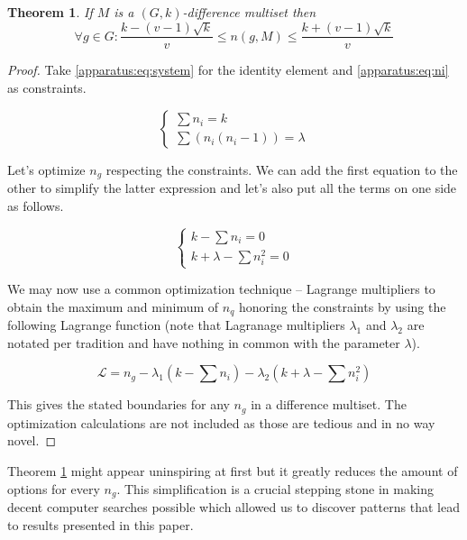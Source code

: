 \documentclass{article}
\theoremstyle{plain}
\newtheorem{theorem}{Theorem}[section]
\theoremstyle{definition}
\theoremstyle{remark}
\begin{document}
		\begin{theorem}
			\label{general:theorem:limits}
			If $M$ is a $(G,k)$-difference multiset then
			\begin{equation}
				\forall g \in G \colon \frac{k-(v-1)\sqrt k}{v} \leq n(g,M) \leq \frac{k+(v-1)\sqrt k}{v}
			\end{equation}
		\end{theorem}
		
		\begin{proof}
			Take \eqref{apparatus:eq:system} for the identity element and \eqref{apparatus:eq:ni} as constraints.
			
			\begin{equation}
				\begin{cases}
					\sum {n_i} = k \\
					\sum (n_i(n_{i}-1)) = \lambda
				\end{cases}
			\end{equation}
			
			Let's optimize $n_g$ respecting the constraints. We can add the first equation to the other to simplify the latter expression and let's also put all the terms on one side as follows.
			
			\begin{equation}
				\begin{cases}
					k - \sum {n_i} = 0 \\
					k + \lambda - \sum n_i^2 = 0
				\end{cases}
			\end{equation}
			
			We may now use a common optimization technique -- Lagrange multipliers to obtain the maximum and minimum of $n_q$ honoring the constraints by using the following Lagrange function (note that Lagranage multipliers $\lambda_1$ and $\lambda_2$ are notated per tradition and have nothing in common with the parameter $\lambda$).
			
			\begin{equation}
				\mathcal L = n_g - \lambda_1 (k - \sum n_i) - \lambda_2 (k + \lambda - \sum n_i^2)
			\end{equation}
			
			This gives the stated boundaries for any $n_g$ in a difference multiset. The optimization calculations are not included as those are tedious and in no way novel.
		\end{proof}
	
		Theorem \ref{general:theorem:limits} might appear uninspiring at first but it greatly reduces the amount of options for every $n_g$. This simplification is a crucial stepping stone in making decent computer searches possible which allowed us to discover patterns that lead to results presented in this paper.
			
\end{document}
